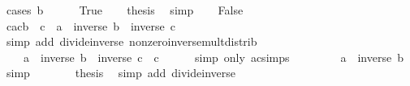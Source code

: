 \begin{isabellebody}
%
\isadelimproof
%
\endisadelimproof
%
\isatagproof
{}\isamarkupfalse%
\ {\isacharparenleft}{\kern0pt}cases\ {\isachardoublequoteopen}b\ {\isacharequal}{\kern0pt}\ {}{\isachardoublequoteclose}{\isacharparenright}{\kern0pt}\isanewline
\ \ \isamarkupfalse%
\ True\ \isamarkupfalse%
\ \isamarkupfalse%
\ {\isacharquery}{\kern0pt}thesis\ \isamarkupfalse%
\ simp\isanewline
{}\isamarkupfalse%
\isanewline
\ \ \isamarkupfalse%
\ False\isanewline
\ \ \isamarkupfalse%
\ \isamarkupfalse%
\ {\isachardoublequoteopen}{\isacharparenleft}{\kern0pt}c{\isacharasterisk}{\kern0pt}a{\isacharparenright}{\kern0pt}{\isacharslash}{\kern0pt}{\isacharparenleft}{\kern0pt}c{\isacharasterisk}{\kern0pt}b{\isacharparenright}{\kern0pt}\ {\isacharequal}{\kern0pt}\ c\ {\isacharasterisk}{\kern0pt}\ a\ {\isacharasterisk}{\kern0pt}\ {\isacharparenleft}{\kern0pt}inverse\ b\ {\isacharasterisk}{\kern0pt}\ inverse\ c{\isacharparenright}{\kern0pt}{\isachardoublequoteclose}\isanewline
\ \ \ \ \isamarkupfalse%
\ {\isacharparenleft}{\kern0pt}simp\ add{\isacharcolon}{\kern0pt}\ divide{\isacharunderscore}{\kern0pt}inverse\ nonzero{\isacharunderscore}{\kern0pt}inverse{\isacharunderscore}{\kern0pt}mult{\isacharunderscore}{\kern0pt}distrib{\isacharparenright}{\kern0pt}\isanewline
\ \ \isamarkupfalse%
\ \isamarkupfalse%
\ {\isachardoublequoteopen}{\isachardot}{\kern0pt}{\isachardot}{\kern0pt}{\isachardot}{\kern0pt}\ {\isacharequal}{\kern0pt}\ \ a\ {\isacharasterisk}{\kern0pt}\ inverse\ b\ {\isacharasterisk}{\kern0pt}\ {\isacharparenleft}{\kern0pt}inverse\ c\ {\isacharasterisk}{\kern0pt}\ c{\isacharparenright}{\kern0pt}{\isachardoublequoteclose}\isanewline
\ \ \ \ \isamarkupfalse%
\ {\isacharparenleft}{\kern0pt}simp\ only{\isacharcolon}{\kern0pt}\ ac{\isacharunderscore}{\kern0pt}simps{\isacharparenright}{\kern0pt}\isanewline
\ \ \isamarkupfalse%
\ \isamarkupfalse%
\ {\isachardoublequoteopen}{\isachardot}{\kern0pt}{\isachardot}{\kern0pt}{\isachardot}{\kern0pt}\ {\isacharequal}{\kern0pt}\ \ a\ {\isacharasterisk}{\kern0pt}\ inverse\ b{\isachardoublequoteclose}\ \isamarkupfalse%
\ simp\isanewline
\ \ \ \ \isamarkupfalse%
\ \isamarkupfalse%
\ {\isacharquery}{\kern0pt}thesis\ \isamarkupfalse%
\ {\isacharparenleft}{\kern0pt}simp\ add{\isacharcolon}{\kern0pt}\ divide{\isacharunderscore}{\kern0pt}inverse{\isacharparenright}{\kern0pt}\isanewline

\end{isabellebody}
